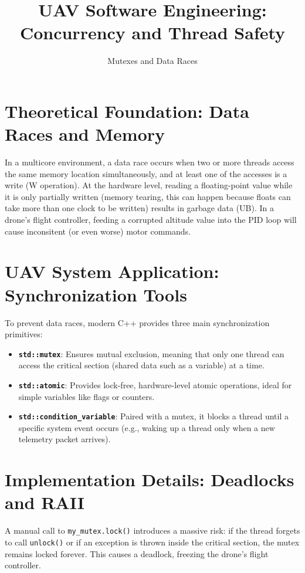 \documentclass{article}
\title{UAV Software Engineering: Concurrency and Thread Safety}
\author{Mutexes and Data Races}
\date{}
\begin{document}
\maketitle

\section{Theoretical Foundation: Data Races and Memory}
In a multicore environment, a data race occurs when two or more threads access the same memory location simultaneously, 
and at least one of the accesses is a write (W operation). 
At the hardware level, reading a floating-point value while it is only partially written (memory tearing, this can happen because floats can take more than one clock to be written) 
results in garbage data (UB). 
In a drone's flight controller, feeding a corrupted altitude value into the PID loop will cause inconsitent (or even worse) motor commands.

\section{UAV System Application: Synchronization Tools}
To prevent data races, modern C++ provides three main synchronization primitives:
\begin{itemize}
    \item \textbf{\texttt{std::mutex}}: Ensures mutual exclusion, meaning that only one thread can access the critical section (shared data such as a variable) at a time.
    \item \textbf{\texttt{std::atomic}}: Provides lock-free, hardware-level atomic operations, ideal for simple variables like flags or counters.
    \item \textbf{\texttt{std::condition\_variable}}: Paired with a mutex, it blocks a thread until a specific system event occurs (e.g., waking up a thread only when a new telemetry packet arrives).
\end{itemize}

\section{Implementation Details: Deadlocks and RAII}
A manual call to \texttt{my\_mutex.lock()} introduces a massive risk: 
if the thread forgets to call \texttt{unlock()} or if an exception is thrown inside the critical section, 
the mutex remains locked forever. 
This causes a deadlock, freezing the drone's flight controller. 
\end{document}

